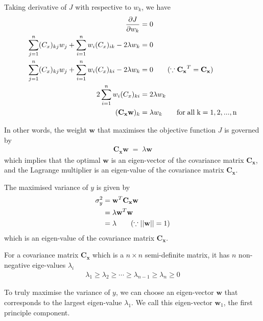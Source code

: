 \documentclass{article}
\begin{document}
Taking derivative of $J$ with respective to $w_{k}$, we have
\begin{align}
    \frac{\partial J}{\partial w_{k}} &= 0 \notag \\
    \sum_{j=1}^{n} (C_{x})_{kj} w_{j} + \sum_{i=1}^{n} w_{i} (C_{x})_{ik} - 2\lambda w_{k} &= 0 \notag  \\
    \sum_{j=1}^{n} (C_{x})_{kj} w_{j} + \sum_{i=1}^{n} w_{i} (C_{x})_{ki} - 2\lambda w_{k} &= 0 \qquad (\because \mathbf{C_{x}}^{T} = \mathbf{C_{x}})  \notag \\
    2 \sum_{i=1}^{n} w_{i} (C_{x})_{ki} &=  2\lambda w_{k} \notag \\
    (\mathbf{C_{x} w})_{k} &= \lambda w_{k} \qquad \mathrm{for \; all \; k = 1, 2, ..., n}
\end{align}

In other words, the weight $\mathbf{w}$ that maximises the objective function $J$ is governed by
\begin{align}
    \mathbf{C_{x} w} \; = \; \lambda \mathbf{w}
\end{align}
which implies that the optimal $\mathbf{w}$ is an eigen-vector of the covariance matrix $\mathbf{C_{x}}$, and the Lagrange multiplier is an eigen-value of the covariance matrix $\mathbf{C_{x}}$.

The maximised variance of $y$ is given by
\begin{align}
    \sigma_{y}^{2} &= \mathbf{w}^{T}\mathbf{C_{x}}\mathbf{w} \notag \\
    &= \lambda \mathbf{w}^{T} \mathbf{w} \notag \\
    &= \lambda \qquad (\because ||\mathbf{w}|| = 1)
\end{align}
which is an eigen-value of the covariance matrix $\mathbf{C_{x}}$.

For a covariance matrix $\mathbf{C_{x}}$ which is a $n \times n$ semi-definite matrix, it has $n$ non-negative eige-values $\lambda_{i}$
\begin{align}
    \lambda_{1} \geq \lambda_{2} \geq \cdots \geq \lambda_{n-1} \geq \lambda_{n} \geq 0
\end{align}

To truly maximise the variance of $y$, we can choose an eigen-vector $\mathbf{w}$ that corresponds to the largest eigen-value $\lambda_{1}$. We call this eigen-vector $\mathbf{w}_{1}$, the first principle component.



\end{document}
